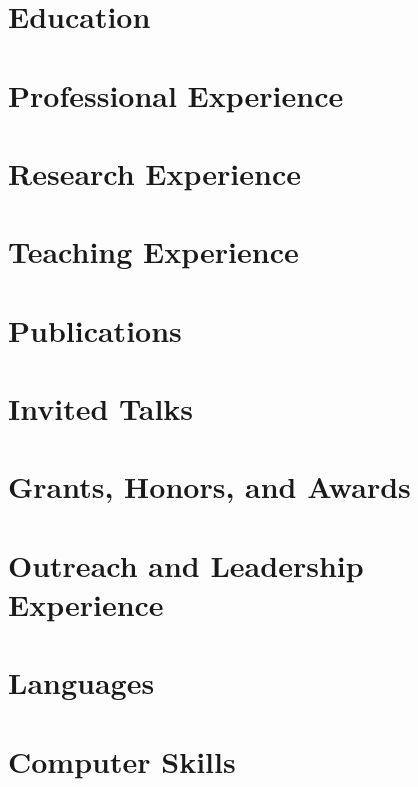 \documentclass[11pt,letterpaper,sans]{moderncv}
\begin{document}
    \makecvtitle

\section{Education}
    
    

\section{Professional Experience}
    
    
    
    
    

\section{Research Experience}
    
    
    
    

\section{Teaching Experience}
    
    
    
    
    
    

\section{Publications}
    
    
    
    
    

\section{Invited Talks}
    

\section{Grants, Honors, and Awards}
    

\section{Outreach and Leadership Experience}
    

\section{Languages}
    

\section{Computer Skills}
    
\end{document}
